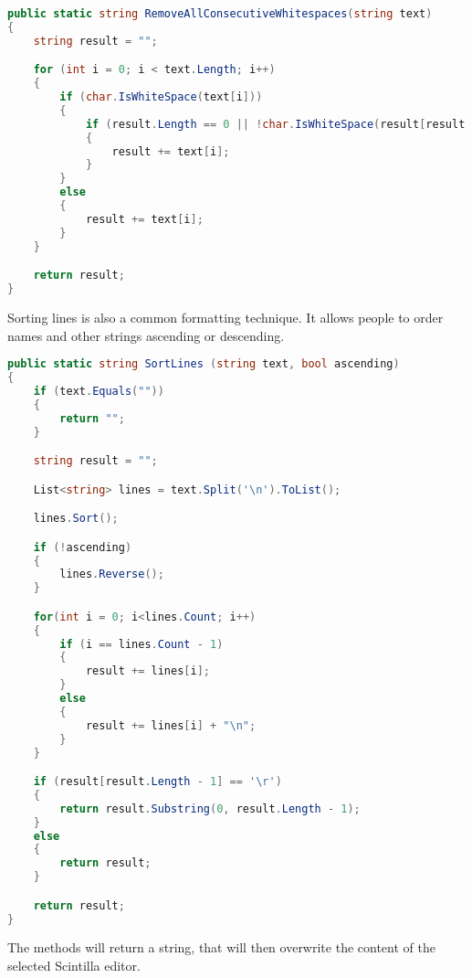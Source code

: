 \begin{lstlisting}[language=csharp, caption={Removing consecutive whitespaces through the RemoveAllConsecutiveWhitespaces() method from the FormattingService class}]
public static string RemoveAllConsecutiveWhitespaces(string text)
{
    string result = "";

    for (int i = 0; i < text.Length; i++)
    {
        if (char.IsWhiteSpace(text[i]))
        {
            if (result.Length == 0 || !char.IsWhiteSpace(result[result.Length - 1]) || text[i] == '\n' || text[i] == '\r')
            {
                result += text[i];
            }
        }
        else
        {
            result += text[i];
        }
    }

    return result;
}
\end{lstlisting}

Sorting lines is also a common formatting technique. It allows people to order names and other strings ascending or descending.

\begin{lstlisting}[language=csharp, caption={Sorting lines ascending or descending through the SortLines() method from the FormattingService class}]
public static string SortLines (string text, bool ascending)
{
    if (text.Equals(""))
    {
        return "";
    }

    string result = "";

    List<string> lines = text.Split('\n').ToList();

    lines.Sort();

    if (!ascending)
    {
        lines.Reverse();
    }

    for(int i = 0; i<lines.Count; i++)
    {
        if (i == lines.Count - 1)
        {
            result += lines[i];
        }
        else
        {
            result += lines[i] + "\n";
        }
    }

    if (result[result.Length - 1] == '\r')
    {
        return result.Substring(0, result.Length - 1);
    }
    else
    {
        return result;
    }

    return result;
}
\end{lstlisting}

The methods will return a string, that will then overwrite the content of the selected Scintilla editor.